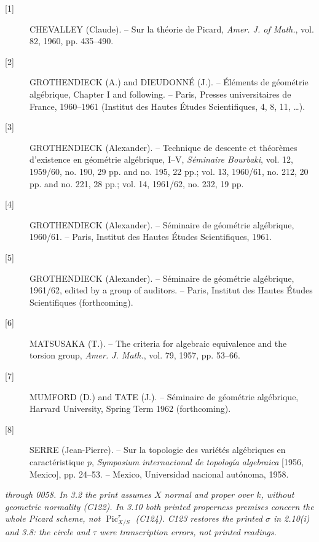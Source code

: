 \begin{description}
\item[{[1]}] CHEVALLEY (Claude). -- Sur la théorie de Picard,
\emph{Amer. J. of Math.}, vol. 82, 1960, pp. 435--490.

\item[{[2]}] GROTHENDIECK (A.) and DIEUDONNÉ (J.). -- Éléments de géométrie
algébrique, Chapter I and following. -- Paris, Presses universitaires de
France, 1960--1961 (Institut des Hautes Études Scientifiques, 4, 8, 11,
\ldots).

\item[{[3]}] GROTHENDIECK (Alexander). -- Technique de descente et théorèmes
d'existence en géométrie algébrique, I--V, \emph{Séminaire Bourbaki}, vol. 12,
1959/60, no. 190, 29 pp. and no. 195, 22 pp.; vol. 13, 1960/61, no. 212,
20 pp. and no. 221, 28 pp.; vol. 14, 1961/62, no. 232, 19 pp.

\item[{[4]}] GROTHENDIECK (Alexander). -- Séminaire de géométrie algébrique,
1960/61. -- Paris, Institut des Hautes Études Scientifiques, 1961.

\item[{[5]}] GROTHENDIECK (Alexander). -- Séminaire de géométrie algébrique,
1961/62, edited by a group of auditors. -- Paris, Institut des Hautes Études
Scientifiques (forthcoming).

\item[{[6]}] MATSUSAKA (T.). -- The criteria for algebraic equivalence and the
torsion group, \emph{Amer. J. Math.}, vol. 79, 1957, pp. 53--66.

\item[{[7]}] MUMFORD (D.) and TATE (J.). -- Séminaire de géométrie algébrique,
Harvard University, Spring Term 1962 (forthcoming).

\item[{[8]}] SERRE (Jean-Pierre). -- Sur la topologie des variétés algébriques
en caractéristique $p$, \emph{Symposium internacional de topología algebraica}
[1956, Mexico], pp. 24--53. -- Mexico, Universidad nacional autónoma, 1958.
\end{description}

\par\smallskip
\begingroup\footnotesize
\noindent\textit{through 0058. In 3.2 the print assumes $X$ normal and proper over $k$, without geometric normality (C122). In 3.10 both printed properness premises concern the whole Picard scheme, not $\operatorname{Pic}_{X/S}^{\tau}$ (C124). C123 restores the printed $\sigma$ in 2.10(i) and 3.8: the circle and $\tau$ were transcription errors, not printed readings.}\par
\endgroup
